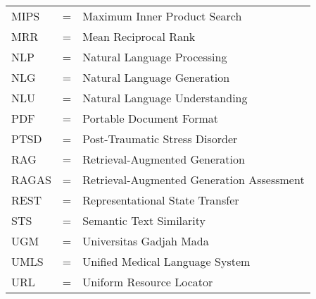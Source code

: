 \begin{tabular}{llp{3in}}
	MIPS    & \hspace{1.5cm} = & Maximum Inner Product Search                                 \\
	MRR     & \hspace{1.5cm} = & Mean Reciprocal Rank                                         \\
	NLP     & \hspace{1.5cm} = & Natural Language Processing                                  \\
	NLG     & \hspace{1.5cm} = & Natural Language Generation                                  \\
	NLU     & \hspace{1.5cm} = & Natural Language Understanding                               \\
	PDF     & \hspace{1.5cm} = & Portable Document Format                                     \\
	PTSD    & \hspace{1.5cm} = & Post-Traumatic Stress Disorder                               \\
	RAG     & \hspace{1.5cm} = & Retrieval-Augmented Generation                               \\
	RAGAS   & \hspace{1.5cm} = & Retrieval-Augmented Generation Assessment                    \\
	REST    & \hspace{1.5cm} = & Representational State Transfer                              \\
	STS     & \hspace{1.5cm} = & Semantic Text Similarity                                     \\
	UGM     & \hspace{1.5cm} = & Universitas Gadjah Mada                                      \\
	UMLS    & \hspace{1.5cm} = & Unified Medical Language System                              \\
	URL     & \hspace{1.5cm} = & Uniform Resource Locator                                     \\
\end{tabular}
